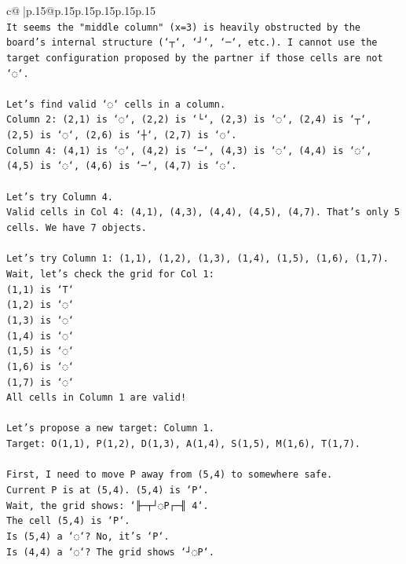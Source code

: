 \documentclass{article}
\begin{document}
{\begin{supertabular}{c@{$\;$}|p{.15\linewidth}@{}p{.15\linewidth}p{.15\linewidth}p{.15\linewidth}p{.15\linewidth}p{.15\linewidth}}
{{{\\ 
\texttt{It seems the "middle column" (x=3) is heavily obstructed by the board's internal structure (`┬`, `┘`, `─`, etc.). I cannot use the target configuration proposed by the partner if those cells are not `◌`.} \\
\\ 
\texttt{Let's find valid `◌` cells in a column.} \\
\texttt{Column 2: (2,1) is `◌`, (2,2) is `└`, (2,3) is `◌`, (2,4) is `┬`, (2,5) is `◌`, (2,6) is `┼`, (2,7) is `◌`.} \\
\texttt{Column 4: (4,1) is `◌`, (4,2) is `─`, (4,3) is `◌`, (4,4) is `◌`, (4,5) is `◌`, (4,6) is `─`, (4,7) is `◌`.} \\
\\ 
\texttt{Let's try Column 4.} \\
\texttt{Valid cells in Col 4: (4,1), (4,3), (4,4), (4,5), (4,7). That's only 5 cells. We have 7 objects.} \\
\\ 
\texttt{Let's try Column 1: (1,1), (1,2), (1,3), (1,4), (1,5), (1,6), (1,7).} \\
\texttt{Wait, let's check the grid for Col 1:} \\
\texttt{(1,1) is `T`} \\
\texttt{(1,2) is `◌`} \\
\texttt{(1,3) is `◌`} \\
\texttt{(1,4) is `◌`} \\
\texttt{(1,5) is `◌`} \\
\texttt{(1,6) is `◌`} \\
\texttt{(1,7) is `◌`} \\
\texttt{All cells in Column 1 are valid!} \\
\\ 
\texttt{Let's propose a new target: Column 1.} \\
\texttt{Target: O(1,1), P(1,2), D(1,3), A(1,4), S(1,5), M(1,6), T(1,7).} \\
\\ 
\texttt{First, I need to move P away from (5,4) to somewhere safe.} \\
\texttt{Current P is at (5,4). (5,4) is `P`.} \\
\texttt{Wait, the grid shows: `╟─┬┘◌P┌─╢ 4`.} \\
\texttt{The cell (5,4) is `P`.} \\
\texttt{Is (5,4) a `◌`? No, it's `P`.} \\
\texttt{Is (4,4) a `◌`? The grid shows `┘◌P`.} \\
}}}
\end{supertabular}}
\end{document}
